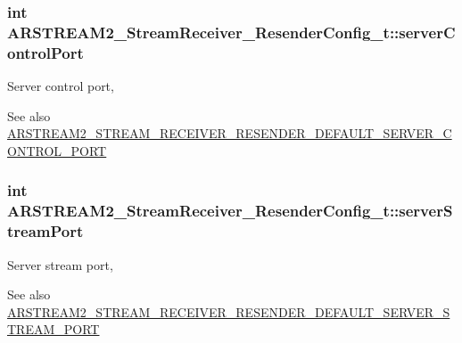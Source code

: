\subsubsection[{\texorpdfstring{server\+Control\+Port}{serverControlPort}}]{\setlength{\rightskip}{0pt plus 5cm}int A\+R\+S\+T\+R\+E\+A\+M2\+\_\+\+Stream\+Receiver\+\_\+\+Resender\+Config\+\_\+t\+::server\+Control\+Port}\hypertarget{struct_a_r_s_t_r_e_a_m2___stream_receiver___resender_config__t_ae7b4ed968186a5febe2f1da1e521e374}{}\label{struct_a_r_s_t_r_e_a_m2___stream_receiver___resender_config__t_ae7b4ed968186a5febe2f1da1e521e374}
Server control port, \begin{DoxySeeAlso}{See also}
\hyperlink{arstream2__stream__receiver_8h_a2460b7c436cf15494c34202ccea2bc6a}{A\+R\+S\+T\+R\+E\+A\+M2\+\_\+\+S\+T\+R\+E\+A\+M\+\_\+\+R\+E\+C\+E\+I\+V\+E\+R\+\_\+\+R\+E\+S\+E\+N\+D\+E\+R\+\_\+\+D\+E\+F\+A\+U\+L\+T\+\_\+\+S\+E\+R\+V\+E\+R\+\_\+\+C\+O\+N\+T\+R\+O\+L\+\_\+\+P\+O\+RT} 
\end{DoxySeeAlso}
\subsubsection[{\texorpdfstring{server\+Stream\+Port}{serverStreamPort}}]{\setlength{\rightskip}{0pt plus 5cm}int A\+R\+S\+T\+R\+E\+A\+M2\+\_\+\+Stream\+Receiver\+\_\+\+Resender\+Config\+\_\+t\+::server\+Stream\+Port}\hypertarget{struct_a_r_s_t_r_e_a_m2___stream_receiver___resender_config__t_a5ea3db7bc9baf84efdf4407f1704ee28}{}\label{struct_a_r_s_t_r_e_a_m2___stream_receiver___resender_config__t_a5ea3db7bc9baf84efdf4407f1704ee28}
Server stream port, \begin{DoxySeeAlso}{See also}
\hyperlink{arstream2__stream__receiver_8h_a3bcd37725ffac66f1aa7a20af4972399}{A\+R\+S\+T\+R\+E\+A\+M2\+\_\+\+S\+T\+R\+E\+A\+M\+\_\+\+R\+E\+C\+E\+I\+V\+E\+R\+\_\+\+R\+E\+S\+E\+N\+D\+E\+R\+\_\+\+D\+E\+F\+A\+U\+L\+T\+\_\+\+S\+E\+R\+V\+E\+R\+\_\+\+S\+T\+R\+E\+A\+M\+\_\+\+P\+O\+RT} 
\end{DoxySeeAlso}
